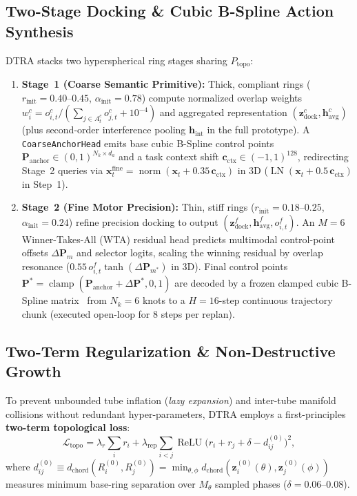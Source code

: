\documentclass[10pt,twocolumn]{article}
\begin{document}
\subsection{Two-Stage Docking \& Cubic B-Spline Action Synthesis}
DTRA stacks two hyperspherical ring stages sharing $P_{\text{topo}}$:
\begin{enumerate}[leftmargin=*,itemsep=2pt]
  \item \textbf{Stage~1 (Coarse Semantic Primitive):} Thick, compliant rings ($r_{\text{init}}=0.40$--$0.45$, $\alpha_{\text{init}}=0.78$) compute normalized overlap weights $w_i^c = o_{i,t}^c / (\sum_{j \in A_t^c} o_{j,t}^c + 10^{-4})$ and aggregated representation $(\mathbf{z}_{\text{dock}}^c, \mathbf{h}_{\text{avg}}^c)$ (plus second-order interference pooling $\mathbf{h}_{\text{int}}$ in the full prototype). A \texttt{CoarseAnchorHead} emits base cubic B-Spline control points $\mathbf{P}_{\text{anchor}} \in (0,1)^{N_k \times d_a}$ and a task context shift $\mathbf{c}_{\text{ctx}} \in (-1,1)^{128}$, redirecting Stage~2 queries via $\mathbf{x}_t^{\text{fine}} = \operatorname{norm}(\mathbf{x}_t + 0.35\,\mathbf{c}_{\text{ctx}})$ in 3D ($\operatorname{LN}(\mathbf{x}_t + 0.5\,\mathbf{c}_{\text{ctx}})$ in Step~1).
  \item \textbf{Stage~2 (Fine Motor Precision):} Thin, stiff rings ($r_{\text{init}}=0.18$--$0.25$, $\alpha_{\text{init}}=0.24$) refine precision docking to output $(\mathbf{z}_{\text{dock}}^f, \mathbf{h}_{\text{avg}}^f, o_{i,t}^f)$. An $M=6$ Winner-Takes-All (WTA) residual head predicts multimodal control-point offsets $\Delta\mathbf{P}_m$ and selector logits, scaling the winning residual by overlap resonance ($0.55\,o_{i,t}^f\tanh(\Delta\mathbf{P}_{m^*})$ in 3D). Final control points $\mathbf{P}^* = \operatorname{clamp}(\mathbf{P}_{\text{anchor}} + \Delta\mathbf{P}^*, 0, 1)$ are decoded by a frozen clamped cubic B-Spline matrix~\cite{son2026abkvla} from $N_k=6$ knots to a $H=16$-step continuous trajectory chunk (executed open-loop for $8$ steps per replan).
\end{enumerate}

\subsection{Two-Term Regularization \& Non-Destructive Growth}
To prevent unbounded tube inflation (\emph{lazy expansion}) and inter-tube manifold collisions without redundant hyper-parameters, DTRA employs a first-principles \textbf{two-term topological loss}:
\begin{equation}
  \mathcal{L}_{\text{topo}}
  = \lambda_r \sum_{i} r_i
  + \lambda_{\text{rep}} \sum_{i < j} \operatorname{ReLU}\!\bigl(r_i + r_j + \delta - d_{ij}^{(0)}\bigr)^2,
  \label{eq:l_topo}
\end{equation}
where $d_{ij}^{(0)} \equiv d_{\text{chord}}(R_i^{(0)}, R_j^{(0)}) = \min_{\theta,\phi} d_{\text{chord}}(\mathbf{z}_i^{(0)}(\theta), \mathbf{z}_j^{(0)}(\phi))$ measures minimum base-ring separation over $M_\theta$ sampled phases ($\delta=0.06$--$0.08$).
\end{document}
